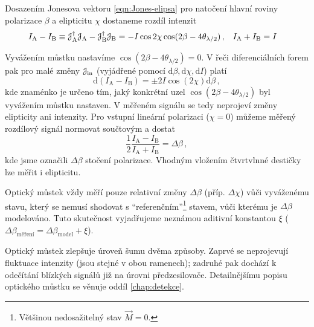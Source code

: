 Dosazením Jonesova vektoru \eqref{eqn:Jones-elipsa} pro natočení hlavní roviny polarizace $\beta$ a elipticitu $\chi$ dostaneme rozdíl intenzit
\begin{align}
    I_\textrm{A}-I_\textrm{B}\equiv\mathcal{J}_\textrm{A}^\dagger\mathcal{J}_\textrm{A}-\mathcal{J}_\textrm{B}^\dagger\mathcal{J}_\textrm{B}&=-I\cos2\chi \cos(2\beta-4\theta_{\lambda/2}) \,, & I_\textrm{A}+I_\textrm{B}&=I
\end{align}

Vyvážením můstku nastavíme $\cos(2\beta-4\theta_{\lambda/2})=0$. 
V řeči diferenciálních forem pak pro malé změny $\mathcal{J}_\textrm{in}$ (vyjádřené pomocí $\textrm{d}\beta, \textrm{d}\chi, \textrm{d}I$) platí
\begin{equation}
\label{eqn:A-B-mustek}
    \textrm{d}(I_\textrm{A}-I_\textrm{B})=\pm 2I\cos(2\chi) \textrm{d}\beta \,,
\end{equation}
kde znaménko je určeno tím, jaký konkrétní uzel $\cos(2\beta-4\theta_{\lambda/2})$ byl vyvážením můstku nastaven.
V měřeném signálu se tedy neprojeví změny elipticity ani intenzity.
Pro vstupní lineární polarizaci ($\chi=0$) můžeme měřený rozdílový signál normovat součtovým a dostat
\begin{equation}
\label{eqn:mustek-delta-beta}
    \frac{1}{2}\frac{I_\textrm{A}-I_\textrm{B}}{I_\textrm{A}+I_\textrm{B}}=\Delta\beta \,,
\end{equation}
kde jsme označili $\Delta\beta$ stočení polarizace.
Vhodným vložením čtvrtvlnné des\-tič\-ky lze měřit i elipticitu\cite{silberQuadraticMagnetoopticKerr2019a}.

Optický můstek vždy měří pouze relativní změny $\Delta\beta$ (příp. $\Delta\chi$) vůči vyváženému stavu, který se nemusí shodovat s ``referenčním''\footnote{Většinou nedosažitelný stav $\vec{M}=0$.} stavem, vůči kterému je $\Delta\beta$ modelováno.
Tuto skutečnost vyjadřujeme neznámou aditivní konstantou $\xi$ ($\Delta\beta_\textrm{měření}=\Delta\beta_\textrm{model}+\xi$).

Optický můstek zlepšuje úroveň šumu dvěma způsoby.
Zaprvé se neprojevují fluktuace intenzity (jsou stejné v obou ramenech); zadruhé pak dochází k odečítání blízkých signálů již na úrovni předzesilovače.
Detailnějšímu popisu optického můstku se věnuje oddíl \ref{chap:detekce}.

